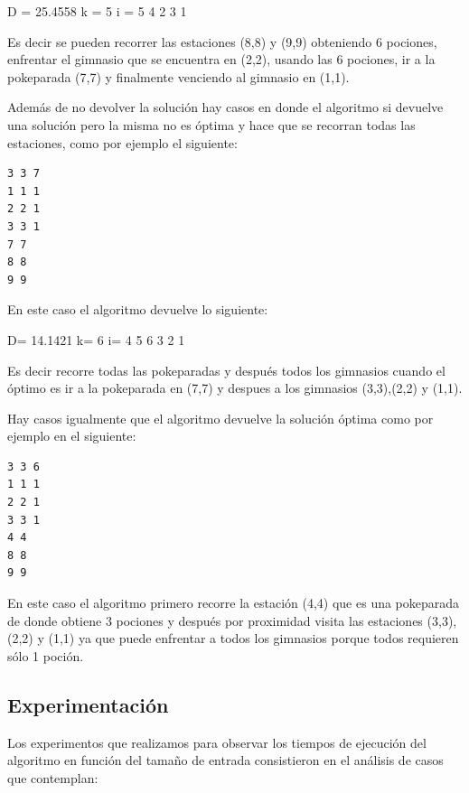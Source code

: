       D = 25.4558 k = 5 i = 5 4 2 3 1

      Es decir se pueden recorrer las estaciones (8,8) y (9,9) obteniendo 6 pociones, enfrentar el gimnasio que se encuentra en (2,2), usando las 6 pociones, ir a la pokeparada (7,7) y finalmente venciendo al gimnasio en (1,1).

      Además de no devolver la solución hay casos en donde el algoritmo si devuelve una solución pero la misma no es óptima y hace que se recorran todas las estaciones, como por ejemplo el siguiente:

\begin{codesnippet}
            \begin{verbatim}
3 3 7
1 1 1
2 2 1
3 3 1
7 7
8 8
9 9

\end{verbatim}
            \end{codesnippet}


      En este caso el algoritmo devuelve lo siguiente:

      D= 14.1421 k= 6 i= 4 5 6 3 2 1

      Es decir recorre todas las pokeparadas y después todos los gimnasios cuando el óptimo es ir a la pokeparada en (7,7) y despues a los gimnasios (3,3),(2,2) y (1,1). 

      Hay casos igualmente que el algoritmo devuelve la solución óptima como por ejemplo en el siguiente:

      \begin{codesnippet}
            \begin{verbatim}
3 3 6
1 1 1
2 2 1
3 3 1
4 4
8 8
9 9

\end{verbatim}
            \end{codesnippet}


      En este caso el algoritmo primero recorre la estación (4,4) que es una pokeparada de donde obtiene 3 pociones y después por proximidad visita las estaciones (3,3),(2,2) y (1,1) ya que puede enfrentar a todos los gimnasios porque todos requieren sólo 1 poción. 

\subsection{Experimentación}

      Los experimentos que realizamos para observar los tiempos de ejecución del algoritmo en función del tamaño de entrada consistieron en el análisis de casos que contemplan:

